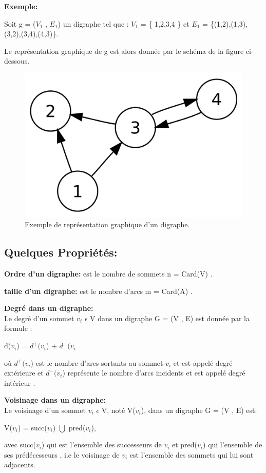 		\textbf{Exemple:}
		
		Soit g = ($V_{1}$ , $E_{1}$) un digraphe tel que : $V_{1}$ = \{ 1,2,3,4 \} et  $E_{1}$ = \{(1,2),(1,3),(3,2),(3,4),(4,3)\}.
		
		
		Le représentation graphique de g est alors donnée par le schéma de la figure ci-dessous.
		
		
			\begin{figure}[h]
			\includegraphics[scale=0.15,center]{./ressources/image/RepDiGraphe.png}
			\caption[Exemple de représentation graphique d'un digraphe.]{Exemple de représentation graphique d'un digraphe.}
			\end{figure}
			
		
		\subsection{Quelques Propriétés:} %
			\textbf{Ordre d'un digraphe:}
			est le nombre de sommets n = Card(V) \citep{DUT}.
			
			\textbf{taille d'un digraphe:} est le nombre d’arcs m = Card(A) \citep{DUT}.
			
			\textbf{Degré dans un digraphe:}\\
			Le degré d'un sommet $v_{i}$ $\epsilon$ V dans un digraphe G = (V , E) est donnée par la formule :\\
			\begin{center}
				d($v_{i}$) = $d^+(v_{i}$) + $d^-(v_{i}$\\
			\end{center}			 
			 où $d^+(v_{i}$) est le nombre d'arcs sortants au sommet $v_{i}$ et est appelé degré extérieure et $d^-(v_{i}$) représente le nombre d'arcs incidents et est appelé degré intérieur \citep{muller}.
			 
			 \textbf{Voisinage dans un digraphe:}\\
			 Le voisinage d'un sommet $v_{i}$ $\epsilon$ V, noté V($v_{i}$), dans un digraphe G = (V , E) est:
			 	\begin{center}
				V($v_{i}$) = succ($v_{i}$) $\bigcup$ pred($v_{i}$),
				\end{center}
				
				 avec succ($v_{i}$) qui est l'ensemble des successeurs de $v_{i}$ et pred($v_{i}$) qui l'ensemble de ses prédécesseurs \citep{bac}, i.e le voisinage de $v_{i}$ est l'ensemble des sommets qui lui sont adjacents.